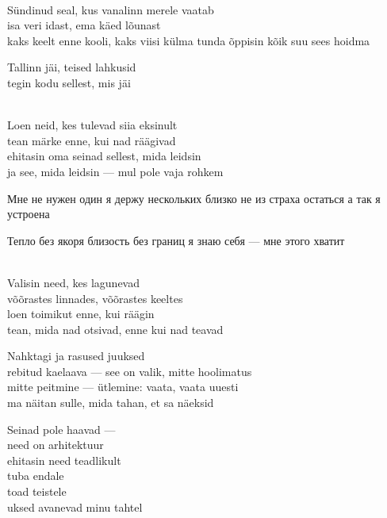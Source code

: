 \begin{lyrics}

\\
Sündinud seal, kus vanalinn merele vaatab\\
isa veri idast, ema käed lõunast\\
kaks keelt enne kooli, kaks viisi külma tunda
õppisin kõik suu sees hoidma

Tallinn jäi, teised lahkusid\\
tegin kodu sellest, mis jäi

\\
Loen neid, kes tulevad siia eksinult\\
tean märke enne, kui nad räägivad\\
ehitasin oma seinad sellest, mida leidsin\\
ja see, mida leidsin — mul pole vaja rohkem

Мне не нужен один
я держу нескольких близко
не из страха остаться
а так я устроена

Тепло без якоря
близость без границ
я знаю себя —
мне этого хватит

\\
Valisin need, kes lagunevad\\
võõrastes linnades, võõrastes keeltes\\
loen toimikut enne, kui räägin\\
tean, mida nad otsivad, enne kui nad teavad

Nahktagi ja rasused juuksed\\
rebitud kaelaava — see on valik, mitte hoolimatus\\
mitte peitmine — ütlemine: vaata, vaata uuesti\\
ma näitan sulle, mida tahan, et sa näeksid


Seinad pole haavad —\\
need on arhitektuur\\
ehitasin need teadlikult\\
tuba endale\\
toad teistele\\
uksed avanevad minu tahtel


\end{lyrics}
